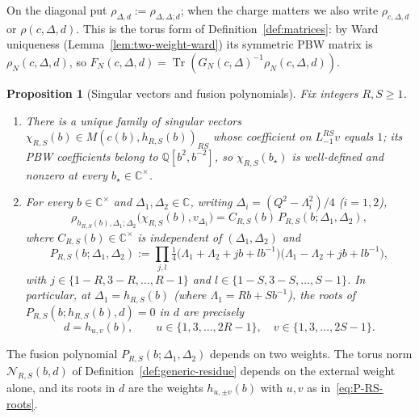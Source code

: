 \documentclass[twoside,10pt]{article}
\numberwithin{equation}{section}
\theoremstyle{slbody}
\newtheorem{proposition}[theorem]{Proposition}
\theoremstyle{definition}
\theoremstyle{remark}
\newcommand{\Tr}{\operatorname{Tr}}
\begin{document}
On the diagonal put \(\rho_{\Delta,d}:=\rho_{\Delta,\Delta;d}\); when the
charge matters we also write \(\rho_{c,\Delta,d}\) or \(\rho(c,\Delta,d)\).  This
is the torus form of Definition~\ref{def:matrices}: by Ward uniqueness
(Lemma~\ref{lem:two-weight-ward}) its symmetric PBW matrix is
\(\rho_N(c,\Delta,d)\), so
\(F_N(c,\Delta,d)=\Tr(G_N(c,\Delta)^{-1}\rho_N(c,\Delta,d))\).

\begin{proposition}[Singular vectors and fusion polynomials]\label{prop:fusion-poly}
Fix integers \(R,S\geq1\).
\begin{enumerate}
 \item[(i)] There is a unique family of singular vectors
   \(\chi_{R,S}(b)\in M(c(b),h_{R,S}(b))_{RS}\) whose coefficient on
   \(L_{-1}^{RS}v\) equals \(1\); its PBW coefficients belong to
   \(\mathbb{Q}[b^2,b^{-2}]\), so \(\chi_{R,S}(b_\star)\) is well-defined and
   nonzero at every \(b_\star\in\mathbb{C}^\times\).
 \item[(ii)] For every \(b\in\mathbb{C}^\times\) and
   \(\Delta_1,\Delta_2\in\mathbb{C}\), writing
   \(\Delta_i=(Q^2-\Lambda_i^2)/4\) (\(i=1,2\)),
   \begin{equation}\label{eq:fusion-poly}
    \rho_{h_{R,S}(b),\Delta_1;\Delta_2}\bigl(\chi_{R,S}(b),v_{\Delta_1}\bigr)
    =C_{R,S}(b)\,P_{R,S}(b;\Delta_1,\Delta_2),
   \end{equation}
   where \(C_{R,S}(b)\in\mathbb{C}^\times\) is independent of
   \((\Delta_1,\Delta_2)\) and
   \begin{equation}\label{eq:P-RS-def}
    P_{R,S}(b;\Delta_1,\Delta_2)
    :=\prod_{j,l}
      \tfrac14\bigl(\Lambda_1+\Lambda_2+jb+lb^{-1}\bigr)
      \bigl(\Lambda_1-\Lambda_2+jb+lb^{-1}\bigr),
   \end{equation}
   with \(j\in\{1-R,3-R,\ldots,R-1\}\) and \(l\in\{1-S,3-S,\ldots,S-1\}\).
   In particular, at \(\Delta_1=h_{R,S}(b)\) (where \(\Lambda_1=Rb+Sb^{-1}\)),
   the roots of \(P_{R,S}(b;h_{R,S}(b),d)=0\) in \(d\) are precisely
   \begin{equation}\label{eq:P-RS-roots}
    d=h_{u,v}(b), \qquad
    u\in\{1,3,\ldots,2R-1\},\quad v\in\{1,3,\ldots,2S-1\}.
   \end{equation}
\end{enumerate}
\end{proposition}

The fusion polynomial \(P_{R,S}(b;\Delta_1,\Delta_2)\) depends on two
weights.  The torus norm \({\mathcal N}_{R,S}(b,d)\) of
Definition~\ref{def:generic-residue} depends on the external weight alone, and
its roots in \(d\) are the weights \(h_{u,\pm v}(b)\) with \(u,v\) as
in~\eqref{eq:P-RS-roots}.
\end{document}
